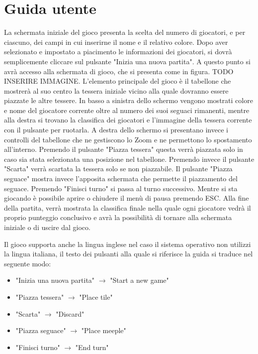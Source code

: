 \section{Guida utente}

La schermata iniziale del gioco presenta la scelta del numero di giocatori, e per ciascuno, dei campi in cui inserirne il nome e il relativo colore. Dopo aver selezionato e impostato a piacimento le informazioni dei giocatori, si dovrà semplicemente cliccare sul pulsante "Inizia una nuova partita". A questo punto si avrà accesso alla schermata di gioco, che si presenta come in figura. TODO INSERIRE IMMAGINE. L'elemento principale del gioco è il tabellone che mostrerà al suo centro la tessera iniziale vicino alla quale dovranno essere piazzate le altre tessere. In basso a sinistra dello schermo vengono mostrati colore e nome del giocatore corrente oltre al numero dei suoi seguaci rimanenti, mentre alla destra si trovano la classifica dei giocatori e l'immagine della tessera corrente con il pulsante per ruotarla. A destra dello schermo si presentano invece i controlli del tabellone che ne gestiscono lo Zoom e ne permettono lo spostamento all'interno. Premendo il pulsante "Piazza tessera" questa verrà piazzata solo in caso sia stata selezionata una posizione nel tabellone. Premendo invece il pulsante "Scarta" verrà scartata la tessera solo se non piazzabile. Il pulsante "Piazza seguace" mostra invece l'apposita schermata che permette il piazzamento del seguace. Premendo "Finisci turno" si passa al turno successivo. Mentre si sta giocando è possibile aprire o chiudere il menù di pausa premendo ESC. Alla fine della partita, verrà mostrata la classifica finale nella quale ogni giocatore vedrà il proprio punteggio conclusivo e avrà la possibilità di tornare alla schermata iniziale o di uscire dal gioco.

Il gioco supporta anche la lingua inglese nel caso il sistema operativo non utilizzi la lingua italiana, il testo dei pulsanti alla quale si riferisce la guida si traduce nel seguente modo:
\begin{itemize}
    \item "Inizia una nuova partita" $\rightarrow$ "Start a new game"
    \item "Piazza tessera" $\rightarrow$ "Place tile"
    \item "Scarta" $\rightarrow$ "Discard"
    \item "Piazza seguace" $\rightarrow$ "Place meeple"
    \item "Finisci turno" $\rightarrow$ "End turn"
\end{itemize}
